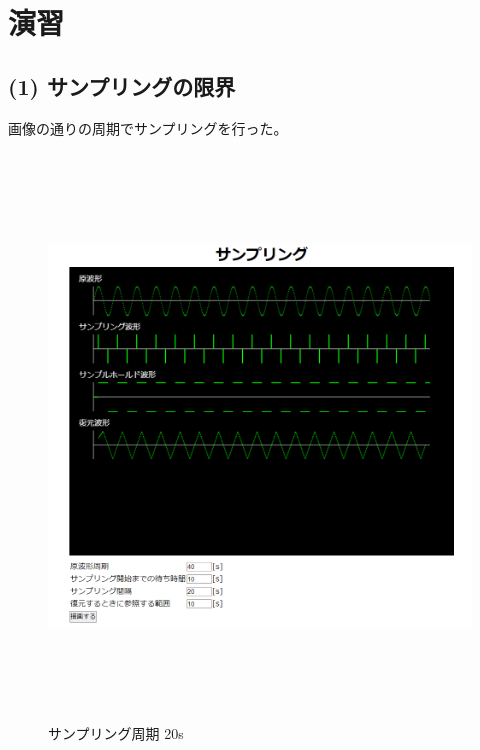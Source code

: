 \documentclass[a4paper,11pt]{jsarticle}
\begin{document}
\section{演習}
\subsection{(1) サンプリングの限界}
画像の通りの周期でサンプリングを行った。
\begin{figure}[H]
  \centering
  \includegraphics[height=15cm]{./images/sampring_20.png}
  \caption{サンプリング周期 20s}
  \label{fig:sample}
\end{figure}
\end{document}

